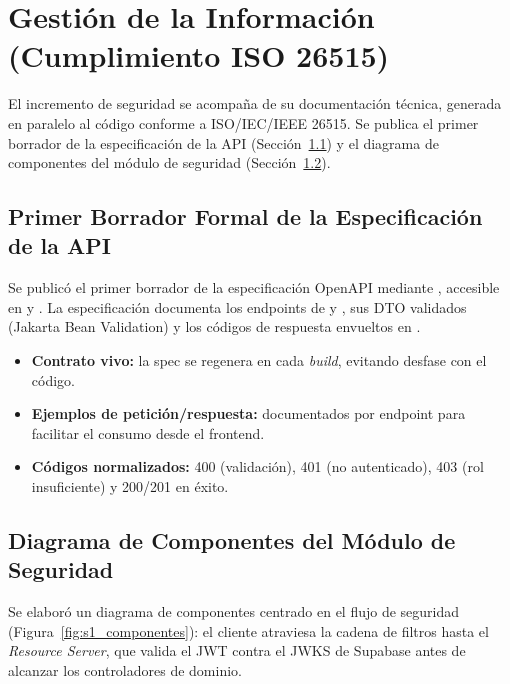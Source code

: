 \section{Gestión de la Información (Cumplimiento ISO 26515)}
\label{sec:s1_gestion}

El incremento de seguridad se acompaña de su documentación técnica, generada en paralelo al
código conforme a ISO/IEC/IEEE 26515. Se publica el primer borrador de la especificación de la
API (Sección~\ref{ssec:s1_gi_openapi}) y el diagrama de componentes del módulo de seguridad
(Sección~\ref{ssec:s1_gi_diagrama}).\par

\subsection{Primer Borrador Formal de la Especificación de la API}
\label{ssec:s1_gi_openapi}
Se publicó el primer borrador de la especificación OpenAPI mediante ,
accesible en  y . La especificación documenta los
endpoints de  y , sus DTO validados (Jakarta Bean Validation) y
los códigos de respuesta envueltos en .

\begin{itemize}[noitemsep]
    \item \textbf{Contrato vivo:} la spec se regenera en cada \textit{build}, evitando desfase
    con el código.
    \item \textbf{Ejemplos de petición/respuesta:} documentados por endpoint para facilitar el
    consumo desde el frontend.
    \item \textbf{Códigos normalizados:} 400 (validación), 401 (no autenticado), 403 (rol
    insuficiente) y 200/201 en éxito.
\end{itemize}

\subsection{Diagrama de Componentes del Módulo de Seguridad}
\label{ssec:s1_gi_diagrama}
Se elaboró un diagrama de componentes centrado en el flujo de seguridad (Figura~\ref{fig:s1_componentes}):
el cliente atraviesa la cadena de filtros hasta el \textit{Resource Server}, que valida el JWT
contra el JWKS de Supabase antes de alcanzar los controladores de dominio.


